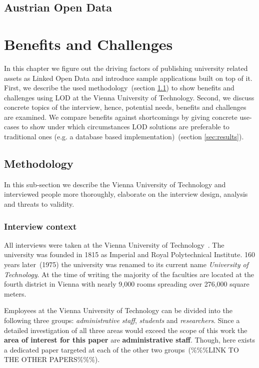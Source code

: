 \documentclass{article}
\begin{document}
\subsection{Austrian Open Data}
\label{sec:austrian_open_data}
\section{Benefits and Challenges}
In this chapter we figure out the driving factors of publishing university related assets as Linked Open Data and introduce sample applications built on top of it. First, we describe the used methodology~(section \ref{sec:methodology}) to show benefits and challenges using LOD at the Vienna University of Technology. Second, we discuss concrete topics of the interview, hence, potential needs, benefits and challenges are examined. We compare benefits against shortcomings by giving concrete use-cases to show under which circumstances LOD solutions are preferable to traditional ones (e.g. a database based implementation)~(section \ref{sec:results}). 
\subsection{Methodology}
\label{sec:methodology}
In this sub-section we describe the Vienna University of Technology and interviewed people more thoroughly, elaborate on the interview design, analysis and threats to validity.
\subsubsection{Interview context}
All interviews were taken at the Vienna University of Technology~\cite{url:university-of-technology-vienna}. The university was founded in 1815 as Imperial and Royal Polytechnical Institute. 160 years later~(1975) the university was renamed to its current name \textit{University of Technology}. At the time of writing the majority of the faculties are located at the fourth district in Vienna with nearly 9,000 rooms spreading over 276,000 square meters.

Employees at the Vienna University of Technology can be divided into the following three groups: \textit{administrative staff}, \textit{students} and \textit{researchers}. Since a detailed investigation of all three areas would exceed the scope of this work the \textbf{area of interest for this paper} are \textbf{administrative staff}. Though, here exists a dedicated paper targeted at each of the other two groups~(\%\%\%LINK TO THE OTHER PAPERS\%\%\%). 
\end{document}
